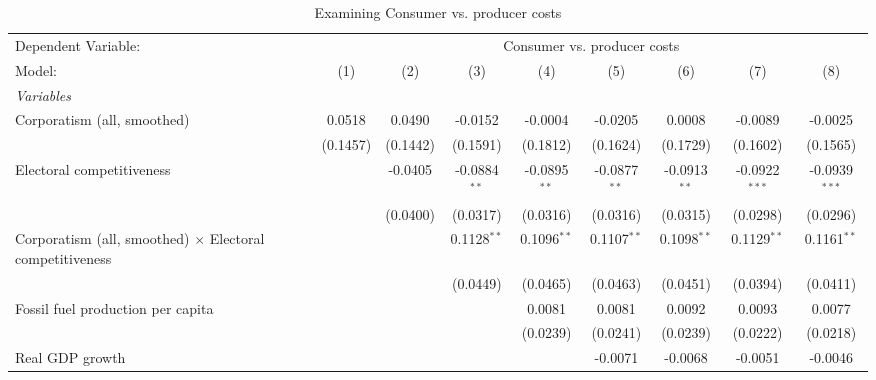 
\begin{table}[htbp]
   \caption{Examining Consumer vs. producer costs}
   \centering
   \begin{tabular}{lcccccccc}
      \tabularnewline \midrule \midrule
      Dependent Variable: & \multicolumn{8}{c}{Consumer vs. producer costs}\\
      Model:                                                          & (1)      & (2)      & (3)            & (4)            & (5)            & (6)            & (7)             & (8)\\  
      \midrule
      \emph{Variables}\\
      Corporatism (all, smoothed)                                     & 0.0518   & 0.0490   & -0.0152        & -0.0004        & -0.0205        & 0.0008         & -0.0089         & -0.0025\\   
                                                                      & (0.1457) & (0.1442) & (0.1591)       & (0.1812)       & (0.1624)       & (0.1729)       & (0.1602)        & (0.1565)\\   
      Electoral competitiveness                                       &          & -0.0405  & -0.0884$^{**}$ & -0.0895$^{**}$ & -0.0877$^{**}$ & -0.0913$^{**}$ & -0.0922$^{***}$ & -0.0939$^{***}$\\   
                                                                      &          & (0.0400) & (0.0317)       & (0.0316)       & (0.0316)       & (0.0315)       & (0.0298)        & (0.0296)\\   
      Corporatism (all, smoothed) $\times$ Electoral competitiveness  &          &          & 0.1128$^{**}$  & 0.1096$^{**}$  & 0.1107$^{**}$  & 0.1098$^{**}$  & 0.1129$^{**}$   & 0.1161$^{**}$\\   
                                                                      &          &          & (0.0449)       & (0.0465)       & (0.0463)       & (0.0451)       & (0.0394)        & (0.0411)\\   
      Fossil fuel production per capita                               &          &          &                & 0.0081         & 0.0081         & 0.0092         & 0.0093          & 0.0077\\   
                                                                      &          &          &                & (0.0239)       & (0.0241)       & (0.0239)       & (0.0222)        & (0.0218)\\   
      Real GDP growth                                                 &          &          &                &                & -0.0071        & -0.0068        & -0.0051         & -0.0046\\   

\end{tabular}
\end{table}
